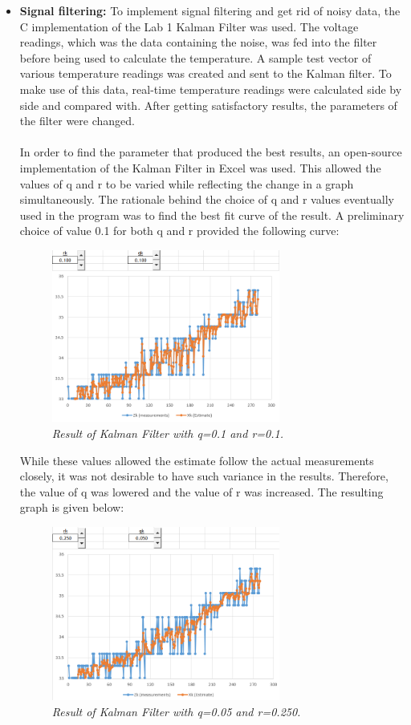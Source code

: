 \documentclass{article}
\begin{document}
\begin{itemize}
\item \textbf{Signal filtering:} To implement signal filtering and get rid of noisy data, the C implementation of the Lab 1 Kalman Filter was used. The voltage readings, which was the data containing the noise, was fed into the filter before being used to calculate the temperature. A sample test vector of various temperature readings was created and sent to the Kalman filter. To make use of this data, real-time temperature readings were calculated side by side and compared with. After getting satisfactory results, the parameters of the filter were changed.\\
\\In order to find the parameter that produced the best results, an open-source implementation of the Kalman Filter in Excel was used. This allowed the values of q and r to be varied while reflecting the change in a graph simultaneously. The rationale behind the choice of q and r values eventually used in the program was to find the best fit curve of the result. A preliminary choice of value 0.1 for both q and r provided the following curve:

\begin{figure}[!ht]
\centering 
\includegraphics[width=7.5cm]{fig_2.png}
\caption{\small \sl Result of Kalman Filter with q=0.1 and r=0.1.}  
\end{figure}
\newpage

While these values allowed the estimate follow the actual measurements closely, it was not desirable to have such variance in the results. Therefore, the value of q was lowered and the value of r was increased. The resulting graph is given below:

\begin{figure}[!ht]
\centering 
\includegraphics[width=7.5cm]{fig_3.png}
\caption{\small \sl Result of Kalman Filter with q=0.05 and r=0.250.}  
\end{figure}


\end{itemize}
\end{document}
